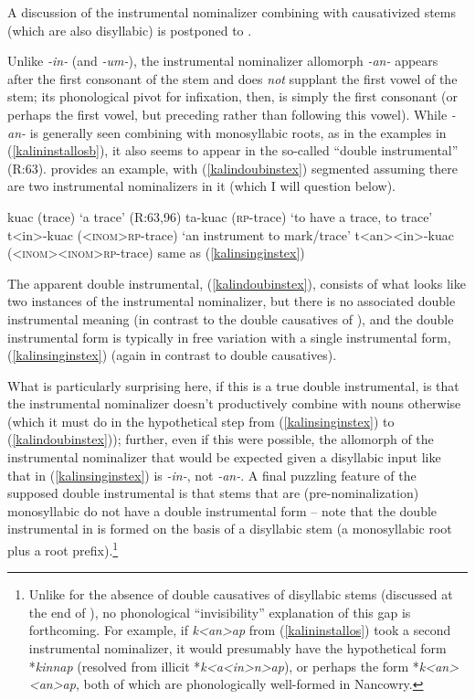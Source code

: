 \documentclass[output=paper]{langscibook}
\begin{document}
\noindent A discussion of the instrumental nominalizer combining with causativized stems (which are also disyllabic) is postponed to .

Unlike \textit{-in-} (and \textit{-um-}), the instrumental nominalizer allomorph \textit{-an-} appears after the first consonant of the stem and does \textit{not} supplant the first vowel of the stem; its phonological pivot for infixation, then, is simply the first consonant (or perhaps the first vowel, but preceding rather than following this vowel). While \textit{-an-} is generally seen combining with monosyllabic roots, as in the examples in (\ref{kalininstallosb}), it also seems to appear in the so-called ``double instrumental'' (R:63). \Next provides an example, with (\ref{kalindoubinstex}) segmented assuming there are two instrumental nominalizers in it (which I will question below).%

\ea\label{kalindoubinst} 
\ea kuac (trace) \hfill `a trace' (R:63,96)
\ex ta-kuac (\textsc{rp-}trace) \hfill `to have a trace, to trace'
\ex t<in>-kuac (\textsc{<inom>rp-}trace)  \hfill `an instrument to mark/trace' \label{kalinsinginstex}
\ex t<an><in>-kuac (\textsc{<inom><inom>rp-}trace)  \hfill same as (\ref{kalinsinginstex}) \label{kalindoubinstex}
\z
\z

\noindent The apparent double instrumental, (\ref{kalindoubinstex}), consists of what looks like two instances of the instrumental nominalizer, but there is no associated double instrumental meaning (in contrast to the double causatives of ), and the double instrumental form is typically in free variation with a single instrumental form, (\ref{kalinsinginstex}) (again in contrast to double causatives).

What is particularly surprising here, if this is a true double instrumental, is that the instrumental nominalizer doesn't productively combine with nouns otherwise (which it must do in the hypothetical step from (\ref{kalinsinginstex}) to (\ref{kalindoubinstex})); further, even if this were possible, the allomorph of the instrumental nominalizer that would be expected given a disyllabic input like that in (\ref{kalinsinginstex}) is \textit{-in-}, not \textit{-an-}. A final puzzling feature of the supposed double instrumental is that stems that are (pre-nominalization) monosyllabic do not have a double instrumental form -- note that the double instrumental in \Last is formed on the basis of a disyllabic stem (a monosyllabic root plus a root prefix).\footnote{Unlike for the absence of double causatives of disyllabic stems (discussed at the end of ), no phonological ``invisibility'' explanation of this gap is forthcoming. For example, if \textit{k<an>ap} from (\ref{kalininstallos}) took a second instrumental nominalizer, it would presumably have the hypothetical form *\textit{kinnap} (resolved from illicit *\textit{k<a<in>n>ap}), or perhaps the form *\textit{k<an><an>ap}, both of which are  phonologically well-formed in Nancowry.}\largerpage
\end{document}
